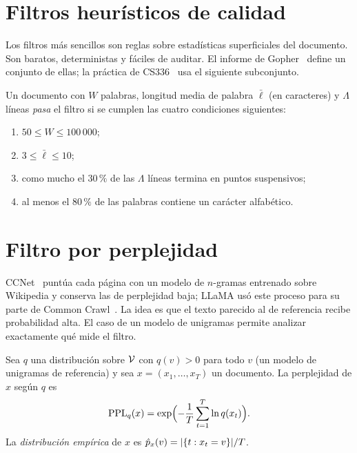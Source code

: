 \addtocounter{figure}{1}%

\section{Filtros heurísticos de calidad}

Los filtros más sencillos son reglas sobre estadísticas superficiales del documento. Son baratos, deterministas y fáciles de auditar. El informe de Gopher~\cite[apéndice~A]{rae} define un conjunto de ellas; la práctica de CS336~\cite[§2.6]{cs336a4} usa el siguiente subconjunto.

\begin{definicion}\label{def:gopher}
Un documento con $W$ palabras, longitud media de palabra $\bar{\ell}$ (en caracteres) y $\Lambda$ líneas \emph{pasa} el filtro si se cumplen las cuatro condiciones siguientes:
\begin{enumerate}
  \item $50\le W\le 100\,000$;
  \item $3\le\bar{\ell}\le 10$;
  \item como mucho el $30\,\%$ de las $\Lambda$ líneas termina en puntos suspensivos;
  \item al menos el $80\,\%$ de las palabras contiene un carácter alfabético.
\end{enumerate}
\end{definicion}

\addtocounter{definicion}{1}%

\section{Filtro por perplejidad}

CCNet~\cite{wenzek} puntúa cada página con un modelo de $n$-gramas entrenado sobre Wikipedia y conserva las de perplejidad baja; LLaMA usó este proceso para su parte de Common Crawl~\cite[§2.1]{llama}. La idea es que el texto parecido al de referencia recibe probabilidad alta. El caso de un modelo de unigramas permite analizar exactamente qué mide el filtro.

\begin{definicion}
Sea $q$ una distribución sobre $\mathcal{V}$ con $q(v)>0$ para todo $v$ (un modelo de unigramas de referencia) y sea $x=(x_1,\dots,x_T)$ un documento. La perplejidad de $x$ según $q$ es
\[
\operatorname{PPL}_q(x)=\exp\Bigl(-\frac1T\sum_{t=1}^{T}\ln q(x_t)\Bigr).
\]
La \emph{distribución empírica} de $x$ es $\hat p_x(v)=\lvert\{t:x_t=v\}\rvert/T$.
\end{definicion}

